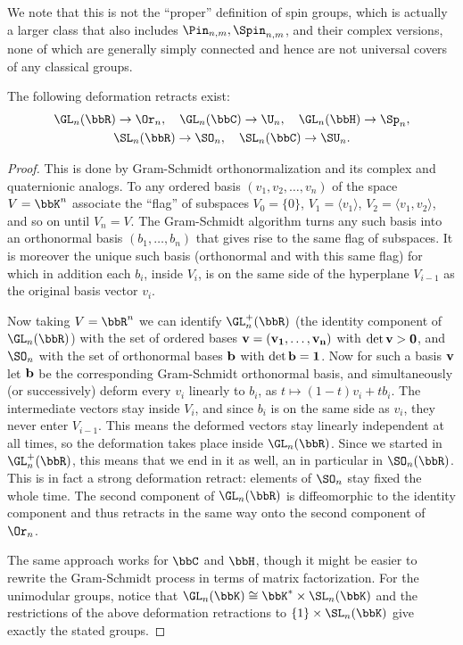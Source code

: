 We note that this is not the ``proper'' definition of spin groups, which is actually a larger class that also includes $\Pin_{n,m},\Spin_{n,m}$, and their complex versions, none of which are generally simply connected and hence are not universal covers of any classical groups.

\begin{prop}
    The following deformation retracts exist:
    \begin{gather}
        \GL_n(\bbR)\to \Or_n,\quad \GL_n(\bbC)\to \U_n, \quad \GL_n(\bbH)\to \Sp_n,\\
        \SL_n(\bbR)\to \SO_n,\quad \SL_n(\bbC)\to \SU_n.
    \end{gather}
\end{prop}
\begin{proof}
     This is done by Gram-Schmidt orthonormalization and its complex and quaternionic analogs. To any ordered basis $(v_1,v_2,\ldots,v_n)$ of the space $V=\bbK^n$ associate the ``flag'' of subspaces $V_0=\{0\}$, $V_1=\langle v_1\rangle$, $V_2=\langle v_1,v_2\rangle$, and so on until $V_n=V$. The Gram-Schmidt algorithm turns any such basis into an orthonormal basis $(b_1,\ldots,b_n)$ that gives rise to the same flag of subspaces. It is moreover the unique such basis (orthonormal and with this same flag) for which in addition each $b_i$, inside $V_i$, is on the same side of the hyperplane $V_{i-1}$ as the original basis vector $v_i$.

     Now taking $V=\bbR^n$ we can identify $\GL_n^+(\bbR)$ (the identity component of $\GL_n(\bbR)$) with the set of ordered bases $\bf{v}=(v_1,\ldots,v_n)$  with $\det \bf{v}>0$, and $\SO_n$ with the set of orthonormal bases $\bf{b}$ with $\det \bf{b}=1$. Now for such a basis $\bf{v}$ let $\bf{b}$ be the corresponding Gram-Schmidt orthonormal basis, and simultaneously (or successively) deform every $v_i$ linearly to $b_i$, as $t\mapsto (1-t)v_i+t b_i$. The intermediate vectors stay inside $V_i$, and since $b_i$ is on the same side as $v_i$, they never enter $V_{i-1}$. This means the deformed vectors stay linearly independent at all times, so the deformation takes place inside $\GL_n(\bbR)$. Since we started in $\GL^+_n(\bbR)$, this means that we end in it as well, an in particular in $\SO_n(\bbR)$. This is in fact a strong deformation retract: elements of $\SO_n$ stay fixed the whole time. The second component of $\GL_n(\bbR)$ is diffeomorphic to the identity component and thus retracts in the same way onto the second component of $\Or_n$.

     The same approach works for $\bbC$ and $\bbH$, though it might be easier to rewrite the Gram-Schmidt process in terms of matrix factorization. For the unimodular groups, notice that $\GL_n(\bbK)\cong \bbK^\ast \times \SL_n(\bbK)$ and the restrictions of the above deformation retractions to $\{1\}\times \SL_n(\bbK)$ give exactly the stated groups.
\end{proof}


